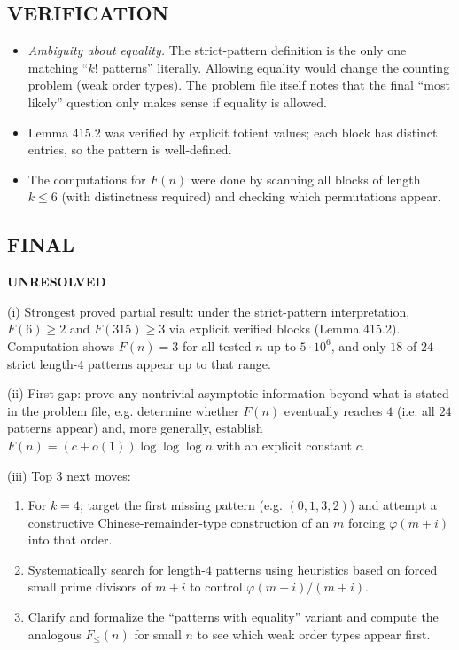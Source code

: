 \subsection*{VERIFICATION}
\begin{itemize}
  \item \emph{Ambiguity about equality.} The strict-pattern definition is the only one matching ``$k!$ patterns'' literally. Allowing equality would change the counting problem (weak order types). The problem file itself notes that the final ``most likely'' question only makes sense if equality is allowed.
  \item Lemma 415.2 was verified by explicit totient values; each block has distinct entries, so the pattern is well-defined.
  \item The computations for $F(n)$ were done by scanning all blocks of length $k\le6$ (with distinctness required) and checking which permutations appear.
\end{itemize}

\subsection*{FINAL}
\textbf{UNRESOLVED}

(i) Strongest proved partial result: under the strict-pattern interpretation, $F(6)\ge2$ and $F(315)\ge3$ via explicit verified blocks (Lemma 415.2). Computation shows $F(n)=3$ for all tested $n$ up to $5\cdot 10^6$, and only $18$ of $24$ strict length-$4$ patterns appear up to that range.

(ii) First gap: prove any nontrivial asymptotic information beyond what is stated in the problem file, e.g. determine whether $F(n)$ eventually reaches $4$ (i.e. all $24$ patterns appear) and, more generally, establish $F(n)=(c+o(1))\log\log\log n$ with an explicit constant $c$.

(iii) Top 3 next moves:
\begin{enumerate}
  \item For $k=4$, target the first missing pattern (e.g. $(0,1,3,2)$) and attempt a constructive Chinese-remainder-type construction of an $m$ forcing $\varphi(m+i)$ into that order.
  \item Systematically search for length-$4$ patterns using heuristics based on forced small prime divisors of $m+i$ to control $\varphi(m+i)/(m+i)$.
  \item Clarify and formalize the ``patterns with equality'' variant and compute the analogous $F_{\le}(n)$ for small $n$ to see which weak order types appear first.
\end{enumerate}

